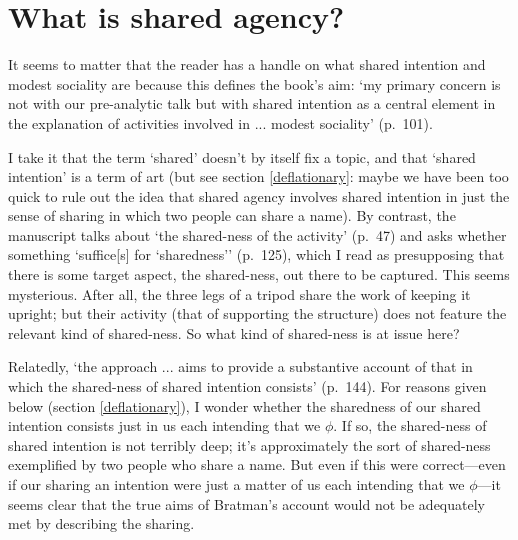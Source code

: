 \documentclass[12pt,letterpaper]{extarticle}
\begin{document}
\setlength\footnotesep{1em}




\maketitle

\tableofcontents





\section{What is shared agency?}
It seems to matter that the reader has a handle on what shared intention and modest sociality are because this defines the book's aim: `my primary concern is not with our pre-analytic talk but with shared intention as a central element in the explanation of activities involved in ... modest sociality' (p.\ 101).

I take it that the term `shared' doesn't by itself fix a topic, and that `shared intention' is a term of art (but see section \vref{deflationary}: maybe we have been too quick to rule out the idea that shared agency involves shared intention in just the sense of sharing in which two people can share a name).
By contrast, the manuscript talks about `the shared-ness of the activity' (p.\ 47) and asks whether something `suffice[s] for `sharedness'' (p.\ 125), which I read as presupposing that there is some target aspect, the shared-ness, out there to be captured.
This seems mysterious.
After all, the three legs of a tripod share the work of keeping it upright; but their activity (that of supporting the structure) does not feature the relevant kind of shared-ness. 
So what kind of shared-ness is at issue here?

Relatedly, `the approach ... aims to provide a substantive account of that in which the shared-ness of shared intention consists' (p.\ 144).
For reasons given below (section \vref{deflationary}), I wonder whether the sharedness of our shared intention consists just in us each intending that we $\phi$.  
If so, the shared-ness of shared intention is not terribly deep; it's approximately the sort of shared-ness exemplified by two people who share a name.
But even if this were correct---even if our sharing an  intention were just a matter of us each intending that we $\phi$---it seems clear that the true aims of Bratman's account would not be adequately met by describing the sharing. 
\end{document}

